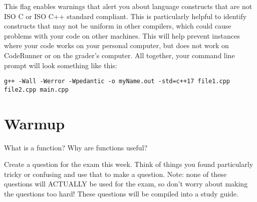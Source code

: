 This flag enables warnings that alert you about language constructs that are not ISO C or ISO C++ standard compliant. This is particularly helpful to identify constructs that may not be uniform in other compilers, which could cause problems with your code on other machines. This will help prevent instances where your code works on your personal computer, but does not work on CodeRunner or on the grader's computer. All together, your command line prompt will look something like this:

\texttt{g++ -Wall -Werror -Wpedantic -o myName.out -std=c++17 file1.cpp file2.cpp main.cpp}

\section{Warmup}

\begin{problem}
    What is a function? Why are functions useful? 
\end{problem}

\begin{problem}
    Create a question for the exam this week. Think of things you found particularly tricky or confusing and use that to make a question. Note: none of these questions will ACTUALLY be used for the exam, so don't worry about making the questions too hard! These questions will be compiled into a study guide.
\end{problem}

